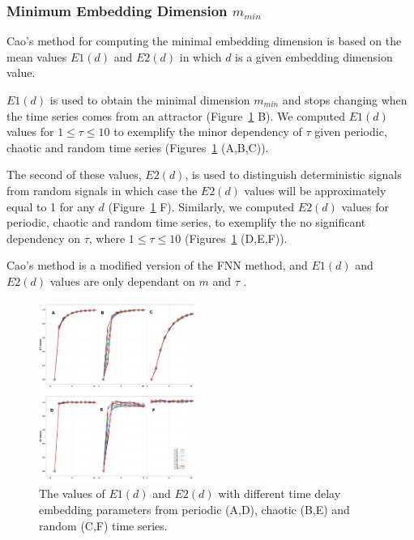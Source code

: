 \documentclass[10pt,journal,compsoc]{IEEEtran}
\begin{document}
\subsubsection{Minimum Embedding Dimension $m_{min}$}
Cao's method \cite{Cao1997} for computing the minimal embedding dimension is based on 
the mean values $E1(d)$ and $E2(d)$ in which $d$ is a given embedding dimension value.

$E1(d)$ is used to obtain the minimal dimension $m_{min}$ and stops changing 
when the time series comes from an attractor (Figure~\ref{fig:e1e2} B).
We computed $E1(d)$ values for $1 \leq \tau \leq 10$ to exemplify 
the minor dependency of $\tau$ given periodic, chaotic and random time series
(Figures~\ref{fig:e1e2} (A,B,C)).

The second of these values, $E2(d)$, is used to distinguish 
deterministic signals from random signals in which case the $E2(d)$ values will be approximately 
equal to 1 for any $d$ (Figure~\ref{fig:e1e2} F).
Similarly, we computed $E2(d)$ values for periodic, chaotic and random time series,
to exemplify the no significant dependency on $\tau$, where $1 \leq \tau \leq 10$ 
(Figures~\ref{fig:e1e2} (D,E,F)).

Cao's method is a modified version of the FNN method, and $E1(d)$ and 
$E2(d)$ values are only dependant on $m$ and $\tau$ \cite{Cao1997}.

\begin{figure}[!htb]
\centering    
\includegraphics[width=0.45\textwidth]{e1e2_v00}
\caption[PA]{The values of $E1(d)$ and $E2(d)$ with different time delay embedding parameters
from periodic (A,D), chaotic (B,E) and random (C,F) time series.}
\label{fig:e1e2}
\end{figure}
\end{document}
